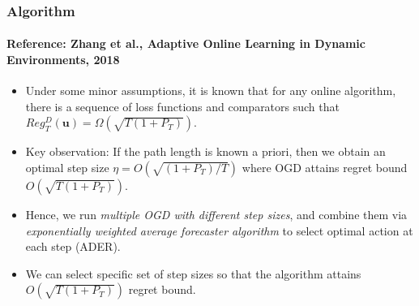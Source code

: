 \documentclass{beamer}
\begin{document}
    \begin{frame}
        \frametitle{Algorithm}
        \framesubtitle{Reference: Zhang et al., Adaptive Online Learning in Dynamic Environments, 2018}
        \begin{itemize}
            \item Under some minor assumptions, it is known that for any online algorithm, there is a sequence of loss functions and comparators such that $Reg_T^{D}(\mathbf{u}) = \Omega(\sqrt{T(1 + P_T)})$.
            \item Key observation: If the path length is known a priori, then we obtain an optimal step size $\eta = O(\sqrt{(1 + P_T)/T})$ where OGD attains regret bound $O(\sqrt{T(1+P_T)})$.
            \item Hence, we run \textit{multiple OGD with different step sizes}, and combine them via \textit{exponentially weighted average forecaster algorithm} to select optimal action at each step (ADER).
            \item We can select specific set of step sizes so that the algorithm attains $O(\sqrt{T(1 + P_T)})$ regret bound.
        \end{itemize}    
    \end{frame}
\end{document}
